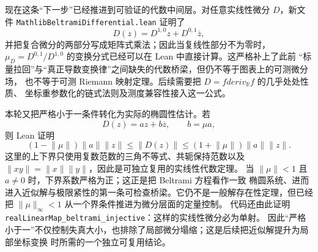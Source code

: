 \documentclass[UTF8,fontset=none,a4paper,11pt]{ctexart}
\begin{document}
现在这条“下一步”已经推进到可验证的代数中间层。对任意实线性微分 \(D\)，新文件
\texttt{MathlibBeltramiDifferential}\allowbreak\texttt{.lean} 证明了
\[
D(z)=D^{1,0}z+D^{0,1}\overline z,
\]
并把复合微分的两部分写成矩阵式乘法；因此当复线性部分不为零时，
\(\mu_D=D^{0,1}/D^{1,0}\) 的变换分式已经可以在 Lean 中直接计算。这严格补上了此前
“标量拉回”与“真正导数变换律”之间缺失的代数桥梁，但仍不等于图表上的可测微分场，
也不等于可测 Riemann 映射定理。后续需要把 \(D=fderiv_{\mathbb R}f\) 的几乎处处性质、
坐标重参数化的链式法则及测度兼容性接入这一公式。

本轮又把严格小于一条件转化为实际的椭圆性估计。若
\[
 D(z)=az+b\overline z,\qquad b=\mu a,
\]
则 Lean 证明
\[
 (1-\lVert\mu\rVert)\lVert a\rVert\lVert z\rVert
 \leq \lVert D(z)\rVert
 \leq (1+\lVert\mu\rVert)\lVert a\rVert\lVert z\rVert.
\]
这里的上下界只使用复数范数的三角不等式、共轭保持范数以及
\(\lVert xy\rVert=\lVert x\rVert\lVert y\rVert\)，因此是可独立复用的实线性代数定理。
当 \(\lVert\mu\rVert<1\) 且 \(a\ne0\) 时，下界系数严格为正；这正是把 Beltrami 方程看作一致
椭圆系统、进而进入近似解与极限紧性的第一条可检查桥梁。它仍不是一般解存在性定理，但已经把
\(\lVert\mu\rVert_\infty<1\) 从一个界条件推进为微分层面的定量控制。
代码还由此证明 \texttt{realLinearMap\_beltrami\_injective}：这样的实线性微分必为单射。
因此“严格小于一”不仅控制失真大小，也排除了局部微分塌缩；这是后续把近似解提升为局部坐标变换
时所需的一个独立可复用结论。
\end{document}
